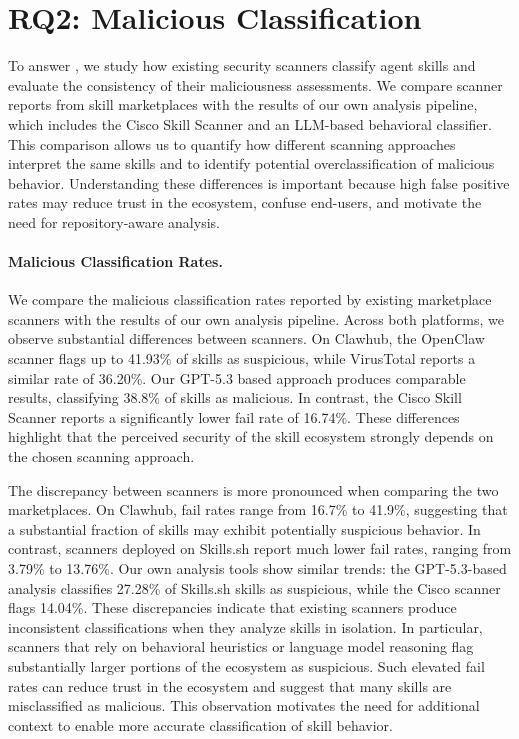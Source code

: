 \section{RQ2: Malicious Classification}

To answer , we study how existing security scanners classify agent skills and evaluate the consistency of their maliciousness assessments. We compare scanner reports from skill marketplaces with the results of our own analysis pipeline, which includes the Cisco Skill Scanner and an LLM-based behavioral classifier. This comparison allows us to quantify how different scanning approaches interpret the same skills and to identify potential overclassification of malicious behavior. Understanding these differences is important because high false positive rates may reduce trust in the ecosystem, confuse end-users, and motivate the need for repository-aware analysis.

\paragraph{Malicious Classification Rates.}



We compare the malicious classification rates reported by existing marketplace scanners with the results of our own analysis pipeline. Across both platforms, we observe substantial differences between scanners. On Clawhub, the OpenClaw scanner flags up to 41.93\% of skills as suspicious, while VirusTotal reports a similar rate of 36.20\%. Our GPT-5.3 based approach produces comparable results, classifying 38.8\% of skills as malicious. In contrast, the Cisco Skill Scanner reports a significantly lower fail rate of 16.74\%. These differences highlight that the perceived security of the skill ecosystem strongly depends on the chosen scanning approach.

The discrepancy between scanners is more pronounced when comparing the two marketplaces. On Clawhub, fail rates range from 16.7\% to 41.9\%, suggesting that a substantial fraction of skills may exhibit potentially suspicious behavior. 
In contrast, scanners deployed on Skills.sh report much lower fail rates, ranging from 3.79\% to 13.76\%. Our own analysis tools show similar trends: the GPT-5.3-based analysis classifies 27.28\%  of Skills.sh skills as suspicious, while the Cisco scanner flags 14.04\%. These discrepancies indicate that existing scanners produce inconsistent classifications when they analyze skills in isolation. In particular, scanners that rely on behavioral heuristics or language model reasoning flag substantially larger portions of the ecosystem as suspicious. Such elevated fail rates can reduce trust in the ecosystem and suggest that many skills are misclassified as malicious. This observation motivates the need for additional context to enable more accurate classification of skill behavior.

